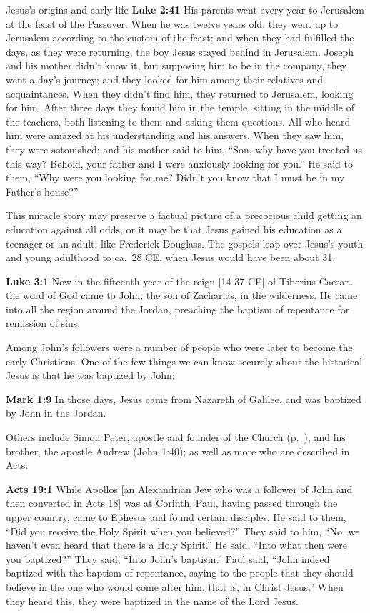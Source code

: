 \documentclass[10pt,twoside]{article} %
\newcommand{\quotesize}{\normalsize{}}
\newcommand{\comm}[1]{\begingroup \color{black!50} #1\endgroup}
\newenvironment{quotetext}{\begingroup\quotesize}{\endgroup}
\newcommand{\intex}[1]{\index[texts]{#1}}
\newcommand{\bible}[2]{\begin{quotetext}\textbf{#1}\intex{#1} #2\end{quotetext}}
\newcommand{\gospelmark}[2]{\bible{Mark #1}{#2}}
\newcommand{\luke}[2]{\bible{Luke #1}{#2}}
\begin{document}
\begin{section}{Jesus's origins and early life}
\luke{2:41}{His parents went every year to Jeru\-salem at the feast of the Passover.  When he was twelve years old, they went up to Jerusalem according to the custom of the feast;  and when they had fulfilled the days, as they were returning, the boy Jesus stayed behind in Jerusalem. Joseph and his mother didn’t know it,  but supposing him to be in the company, they went a day’s journey; and they looked for him among their relatives and acquaintances.  When they didn’t find him, they returned to Jerusalem, looking for him.  After three days they found him in the temple, sitting in the middle of the teachers, both listening to them and asking them questions.  All who heard him were amazed at his understanding and his answers.  When they saw him, they were astonished; and his mother said to him, ``Son, why have you treated us this way? Behold, your father and I were anxiously looking for you.''
 He said to them, ``Why were you looking for me? Didn’t you know that I must be in my Father’s house?''}

\comm{
This miracle story may preserve a factual picture of a precocious child getting an education against all odds, or
it may be that Jesus gained his education as a teenager or an adult, like Frederick Douglass. The gospels leap
over Jesus's youth and young adulthood to ca.~28 CE, when Jesus would have been about 31.
}

\luke{3:1}{Now in the fifteenth year of the reign [14-37 CE] of Tiberius
Caesar\ldots the word of God came to John, the son of Zacharias, in
the wilderness.  He came into all the region around the Jordan,
preaching the baptism of repentance for remission of sins.}

\comm{
Among John's followers were a number of people who were later to become the early Christians.
One of the few things we can know securely about the historical Jesus is that he was baptized
by John:
}

\gospelmark{1:9}{In those days, Jesus came from Nazareth of Galilee, and was baptized by John in the Jordan.}

\comm{Others include Simon Peter, apostle and founder of the Church (p.~\pageref{peter-called}), and his brother, the apostle Andrew (John 1:40);
 as well as more who are described in Acts:}

\bible{Acts 19:1}{While Apollos [an Alexandrian Jew who was a follower of John and then converted in Acts 18] was at Corinth, Paul, having passed through the upper country, came to Ephesus and found certain disciples. He said to them, “Did you receive the Holy Spirit when you believed?”
They said to him, ``No, we haven’t even heard that there is a Holy Spirit.''
 He said, ``Into what then were you baptized?''
They said, ``Into John’s baptism.''
 Paul said, ``John indeed baptized with the baptism of repentance, saying to the people that they should believe in the one who would come after him, that is, in Christ Jesus.''
 When they heard this, they were baptized in the name of the Lord Jesus.}


\end{section}
\end{document}
